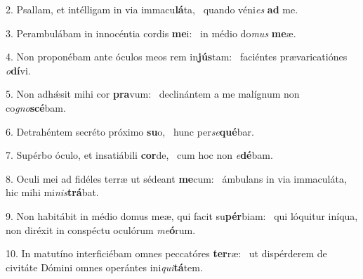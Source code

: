 2. Psallam, et intélligam in via immacu\textbf{lá}ta, \ast\  quando véni\textit{es} \textbf{ad} me.\

3. Perambulábam in innocéntia cordis \textbf{me}i: \ast\  in médio do\textit{mus} \textbf{me}æ.\

4. Non proponébam ante óculos meos rem in\textbf{jús}tam: \ast\  faciéntes prævaricatiónes \textit{o}\textbf{dí}vi.\

5. Non adhǽsit mihi cor \textbf{pra}vum: \ast\  declinántem a me malígnum non co\textit{gno}\textbf{scé}bam.\

6. Detrahéntem secréto próximo \textbf{su}o, \ast\  hunc per\textit{se}\textbf{qué}bar.\

7. Supérbo óculo, et insatiábili \textbf{cor}de, \ast\  cum hoc non \textit{e}\textbf{dé}bam.\

8. Oculi mei ad fidéles terræ ut sédeant \textbf{me}cum: \ast\  ámbulans in via immaculáta, hic mihi mi\textit{nis}\textbf{trá}bat.\

9. Non habitábit in médio domus meæ, qui facit su\textbf{pér}biam: \ast\  qui lóquitur iníqua, non diréxit in conspéctu oculórum \textit{me}\textbf{ó}rum.\

10. In matutíno interficiébam omnes peccatóres \textbf{ter}ræ: \ast\  ut dispérderem de civitáte Dómini omnes operántes ini\textit{qui}\textbf{tá}tem.\

